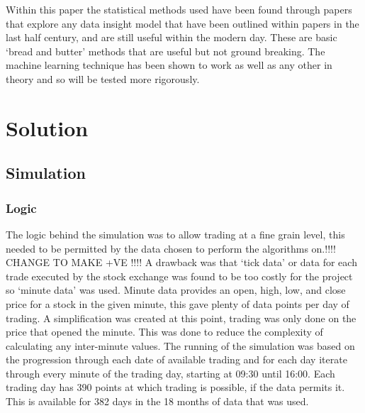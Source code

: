\documentclass[12pt,a4paper]{article}
\begin{document}
Within this paper the statistical methods used have been found through papers that explore any data insight model that have been outlined within papers in the last half century, and are still useful within the modern day. These are basic `bread and butter' methods that are useful but not ground breaking. The machine learning technique has been shown to work as well as any other in theory and so will be tested more rigorously.\\

\iffalse
#################################################################################
\fi

\section{Solution}

\iffalse
This section presents the solutions to the problems in detail.  The design and implementation details should all be placed in this section.  You may create a number of subsections, each focussing on one issue.
This section should be between 4 to 7 pages in length.
\fi

\iffalse
#################################################################################
\fi

\subsection{Simulation}

\subsubsection{Logic}

The logic behind the simulation was to allow trading at a fine grain level, this needed to be permitted by the data chosen to perform the algorithms on.!!!! CHANGE TO MAKE +VE !!!! A drawback was that `tick data' or data for each trade executed by the stock exchange was found to be too costly for the project so `minute data' was used. Minute data provides an open, high, low, and close price for a stock in the given minute, this gave plenty of data points per day of trading. A simplification was created at this point, trading was only done on the price that opened the minute. This was done to reduce the complexity of calculating any inter-minute values. The running of the simulation was based on the progression through each date of available trading and for each day iterate through every minute of the trading day, starting at 09:30 until 16:00. Each trading day has 390 points at which trading is possible, if the data permits it. This is available for 382 days in the 18 months of data that was used. 
\end{document}
